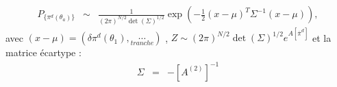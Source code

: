 	\begin{eqnarray}
		P_{\{\pi^d(\theta_a)\} } & \sim & 	\frac{1}{(2 \pi)^{N/2} \det ( \Sigma ) ^{1/2}} \exp \left ( - \frac{1}{2} ( x - \mu )^T \Sigma^{-1} ( x - \mu ) \right )	,
	\end{eqnarray}
	avec $( x - \mu ) = (\delta \pi^d ( \theta_1) , \underset{tranche}{ \cdots} )$ , $Z \sim (2 \pi)^{N/2}  \det ( \Sigma )^{1/2} e^{A[\overline{\pi}^d]}$ et la matrice écartype :
	\begin{eqnarray}
		\Sigma & =& - \left [ A^{(2)} \right ]^{-1} 	
	\end{eqnarray}